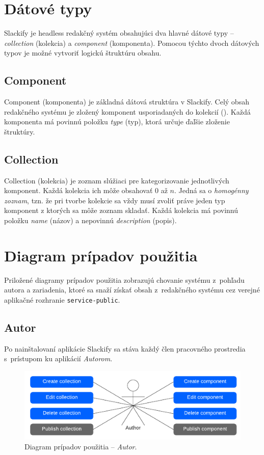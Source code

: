 \section{Dátové typy}
Slackify je headless redakčný systém obsahujúci dva hlavné dátové typy -- \emph{collection} (kolekcia) a \emph{component} (komponenta). Pomocou týchto dvoch dátových typov je možné vytvoriť logickú štruktúru obsahu.

\subsection{Component}
Component (komponenta) je základná dátová struktúra v Slackify. Celý obsah redakčného systému je zložený komponent usporiadaných do kolekcií (). Každá komponenta má povinnú položku \emph{type} (typ), ktorá určuje ďaľšie zloženie štruktúry.


\subsection{Collection}
\label{subsection:collection}
Collection (kolekcia) je zoznam slúžiaci pre kategorizovanie jednotlivých komponent. Každá kolekcia ich môže obsahovať 0 až $n$. Jedná sa o \emph{homogénny zoznam}, tzn. že pri tvorbe kolekcie sa vždy musí zvoliť práve jeden typ komponent z ktorých sa môže zoznam skladať. Každá kolekcia má povinnú položku \emph{name} (názov) a nepovinnú \emph{description} (popis).

\section{Diagram prípadov použitia}
Priložené diagramy prípadov použitia zobrazujú chovanie systému z~pohľadu autora a zariadenia, ktoré sa snaží získať obsah z~redakčného systému cez verejné aplikačné rozhranie \texttt{service-public}.

\subsection{Autor}
Po nainštalovaní aplikácie Slackify sa stáva každý člen pracovného prostredia s~prístupom ku aplikácií \emph{Autorom}.

\begin{figure}[h]
	\centering
	\includegraphics[scale=1.4]{obrazky-figures/author_user_case}
	\caption{Diagram prípadov použitia -- \emph{Autor}.}
\end{figure}

